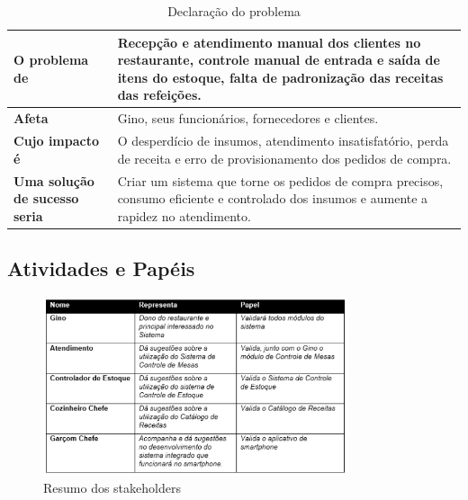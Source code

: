 \begin{table}[htb]
      \begin{center}
        \begin{tabular}{| p{6cm} | p{6cm} |}
        \hline
        \textbf{O problema de} & Recepção e atendimento manual dos clientes no restaurante, controle manual de entrada e saída de itens do estoque, falta de padronização das receitas das refeições.  \\ \hline
        \textbf{Afeta} & Gino, seus funcionários, fornecedores e clientes. \\ \hline
        \textbf{Cujo impacto é} & O desperdício de insumos, atendimento insatisfatório, perda de receita e erro de provisionamento dos pedidos de compra. \\ \hline
        \textbf{Uma solução de sucesso seria} & Criar um sistema que torne os pedidos de compra precisos, consumo eficiente e controlado dos insumos e aumente a rapidez no atendimento. \\ \hline
        
        \end{tabular}
      \end{center}
    \caption{Declaração do problema}
    \end{table}


\subsection{Atividades e Papéis}

\begin{figure}[H]
  \centering
  \includegraphics[width=0.8\textwidth]{softwareengineer/images/stakeholders} 
  \caption{Resumo dos stakeholders}
  \label{fig:stakeholders} 
\end{figure}

